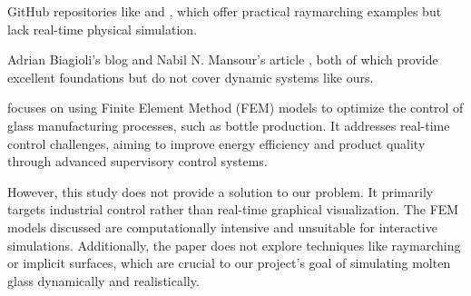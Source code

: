 \documentclass{rapportcs}
\begin{document}
    GitHub repositories like \cite{hecomi_raymarching_2024} and \cite{koskimies_raymarching_2024}, which offer practical raymarching examples but lack real-time physical simulation.

    Adrian Biagioli's blog \cite{biagioli_raymarching_2024} and Nabil N. Mansour's article \cite{mansour_sdf_2024}, both of which provide excellent foundations but do not cover dynamic systems like ours.

    \cite{grega2015modelling} focuses on using Finite Element Method (FEM) models to optimize the control of glass manufacturing processes, such as bottle production. It addresses real-time control challenges, aiming to improve energy efficiency and product quality through advanced supervisory control systems.

    However, this study does not provide a solution to our problem. It primarily targets industrial control rather than real-time graphical visualization. The FEM models discussed are computationally intensive and unsuitable for interactive simulations. Additionally, the paper does not explore techniques like raymarching or implicit surfaces, which are crucial to our project’s goal of simulating molten glass dynamically and realistically.

    \newpage

    \newpage
\end{document}
